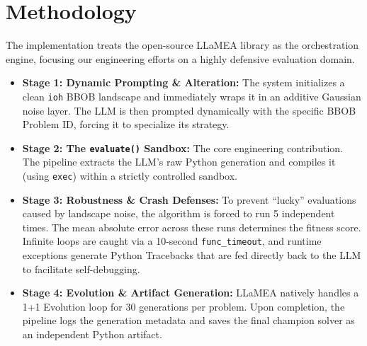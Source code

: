 

\chapter{Methodology}\label{chap:methodology}

The implementation treats the open-source LLaMEA library as the orchestration engine, focusing our engineering efforts on a highly defensive evaluation domain.

\begin{itemize}
    \item \textbf{Stage 1: Dynamic Prompting \& Alteration:} The system initializes a clean \texttt{ioh} BBOB landscape and immediately wraps it in an additive Gaussian noise layer. The LLM is then prompted dynamically with the specific BBOB Problem ID, forcing it to specialize its strategy.
    
    \item \textbf{Stage 2: The \texttt{evaluate()} Sandbox:} The core engineering contribution. The pipeline extracts the LLM's raw Python generation and compiles it (using \texttt{exec}) within a strictly controlled sandbox.
    
    \item \textbf{Stage 3: Robustness \& Crash Defenses:} To prevent ``lucky'' evaluations caused by landscape noise, the algorithm is forced to run 5 independent times. The mean absolute error across these runs determines the fitness score. Infinite loops are caught via a 10-second \texttt{func\_timeout}, and runtime exceptions generate Python Tracebacks that are fed directly back to the LLM to facilitate self-debugging.
    
    \item \textbf{Stage 4: Evolution \& Artifact Generation:} LLaMEA natively handles a 1+1 Evolution loop for 30 generations per problem. Upon completion, the pipeline logs the generation metadata and saves the final champion solver as an independent Python artifact.
\end{itemize}